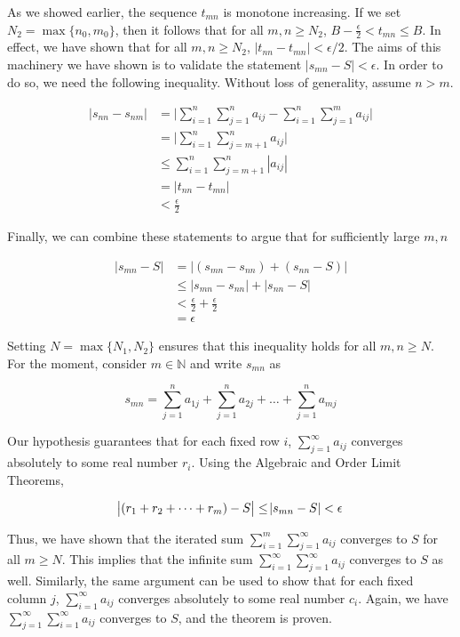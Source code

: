 \documentclass{article}
\begin{document}
As we showed earlier, the sequence $t_{mn}$ is monotone increasing. If we set $N_2 = \max\{n_0, m_0\}$, then it follows that for all $m, n \geq N_2$, $B - \frac{\epsilon}{2} < t_{mn} \leq B$. In effect, we have shown that for all $m, n \geq N_2$, $|t_{nn} - t_{mn}| < \epsilon / 2$. The aims of this machinery we have shown is to validate the statement $|s_{mn} - S| < \epsilon$. In order to do so, we need the following inequality. Without loss of generality, assume $n > m$.

\begin{equation}
\begin{split}
    |s_{nn} - s_{nm}| &= \Bigg|\sum_{i=1}^n \sum_{j=1}^n a_{ij} - \sum_{i=1}^n \sum_{j=1}^m a_{ij}\Bigg| \\
    &= \Bigg|\sum_{i=1}^n \sum_{j=m+1}^n a_{ij}\Bigg| \\
    &\leq \sum_{i=1}^n \sum_{j=m+1}^n |a_{ij}| \\
    &=|t_{nn} - t_{mn}| \\
    &< \frac{\epsilon}{2}
\end{split}
\end{equation}

Finally, we can combine these statements to argue that for sufficiently large $m, n$

\begin{equation}
\begin{split}
    |s_{mn} - S| &= |(s_{mn} - s_{nn}) + (s_{nn} - S)| \\
    &\leq | s_{mn} - s_{nn} | + |s_{nn} - S| \\
    &< \frac{\epsilon}{2} + \frac{\epsilon}{2} \\
    &= \epsilon
\end{split}
\end{equation}

Setting $N = \max \{N_1, N_2\}$ ensures that this inequality holds for all $m, n \geq N$. For the moment, consider $m \in 
\mathbb{N}$ and write $s_{mn}$ as

\begin{equation}
    s_{mn} = \sum_{j=1}^n a_{1j} + \sum_{j=1}^n a_{2j} + \dots + \sum_{j=1}^n a_{mj}
\end{equation}

Our hypothesis guarantees that for each fixed row $i$, $\sum_{j=1}^\infty a_{ij}$ converges absolutely to some real number $r_i$. Using the Algebraic and Order Limit Theorems, 

\begin{equation}
    \abs{(r_1 + r_2 + \dots + r_m) - S} \leq \abs{s_{mn} - S} < \epsilon
\end{equation}

Thus, we have shown that the iterated sum $\sum_{i=1}^m \sum_{j=1}^\infty a_{ij}$ converges to $S$ for all $m \geq N$. This implies that the infinite sum  $\sum_{i=1}^\infty \sum_{j=1}^\infty a_{ij}$ converges to $S$ as well. Similarly, the same argument can be used to show that for each fixed column $j$, $\sum_{i=1}^\infty a_{ij}$ converges absolutely to some real number $c_i$. Again, we have $\sum_{j=1}^\infty \sum_{i=1}^\infty a_{ij}$ converges to $S$, and the theorem is proven. 
\end{document}
